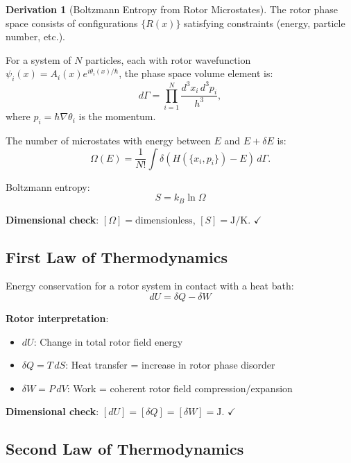 \documentclass[12pt,a4paper]{article}
\theoremstyle{definition}
\newtheorem{derivation}{Derivation}[section]
\theoremstyle{remark}
\begin{document}
\begin{derivation}[Boltzmann Entropy from Rotor Microstates]

The rotor phase space consists of configurations $\{R(x)\}$ satisfying constraints (energy, particle number, etc.).

For a system of $N$ particles, each with rotor wavefunction $\psi_i(x) = A_i(x) e^{i\theta_i(x)/\hbar}$, the phase space volume element is:
\begin{equation}
d\Gamma = \prod_{i=1}^N \frac{d^3x_i \, d^3p_i}{h^3},
\end{equation}
where $p_i = \hbar \nabla \theta_i$ is the momentum.

The number of microstates with energy between $E$ and $E + \delta E$ is:
\begin{equation}
\Omega(E) = \frac{1}{N!} \int \delta(H(\{x_i, p_i\}) - E) \, d\Gamma.
\end{equation}

Boltzmann entropy:
\begin{equation}
\boxed{S = k_B \ln \Omega}
\end{equation}

\textbf{Dimensional check}: $[\Omega] = \text{dimensionless}$, $[S] = \text{J/K}$. $\checkmark$
\end{derivation}

\subsection{First Law of Thermodynamics}

Energy conservation for a rotor system in contact with a heat bath:
\begin{equation}
\boxed{dU = \delta Q - \delta W}
\end{equation}

\textbf{Rotor interpretation}:
\begin{itemize}
\item $dU$: Change in total rotor field energy
\item $\delta Q = T \, dS$: Heat transfer = increase in rotor phase disorder
\item $\delta W = P \, dV$: Work = coherent rotor field compression/expansion
\end{itemize}

\textbf{Dimensional check}: $[dU] = [\delta Q] = [\delta W] = \text{J}$. $\checkmark$

\subsection{Second Law of Thermodynamics}
\end{document}
